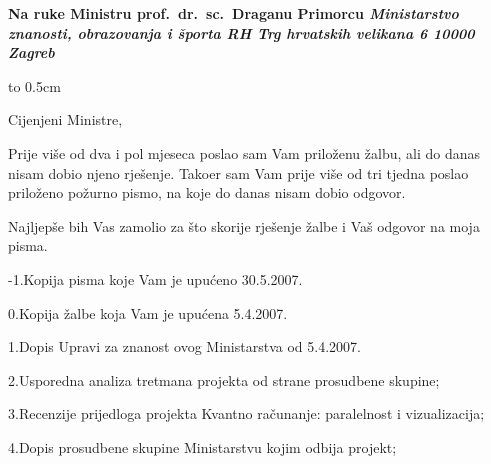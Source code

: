 \parindent=0cm


\address
\parindent=20pt
\bf 
\medskip
Na ruke
Ministru prof.~dr.~sc.~Draganu Primorcu 
\smallskip
\it Ministarstvo znanosti, obrazovanja i \v sporta RH
\rm Trg hrvatskih velikana 6 
10000 Zagreb

\endaddress

\vbox to 0.5cm{\vfill}


\parindent=0pt    


\bigskip\bigskip\bigskip
Cijenjeni Ministre, 


\bigskip\bigskip

Prije  vi\v se od dva i pol mjeseca poslao sam Vam prilo\v zenu 
\v zalbu, ali do danas nisam dobio njeno rje\v senje. Tako\dj er 
sam Vam prije vi\v se od tri tjedna poslao prilo\v zeno po\v zurno 
pismo, na koje do danas nisam dobio odgovor.

\parindent=20pt    
\medskip
Najljep\v se bih Vas zamolio za \v sto skorije rje\v senje \v zalbe i 
Va\v s odgovor na moja pisma.   

\bigskip\bigskip



\rm
\bigskip\bigskip\bigskip\bigskip\bigskip\bigskip

\medskip 
{}


\bigskip\bigskip\bigskip\bigskip\bigskip\bigskip
\parindent=0pt   
\sss
{}


\medskip
\item{-1.}Kopija pisma koje Vam je upu\'ceno 30.5.2007.

\smallskip
\item{0.}Kopija \v zalbe koja Vam je upu\'cena 5.4.2007.

\smallskip
\item{1.}Dopis \ssi Upravi za znanost\/ \sss ovog Ministarstva 
od 5.4.2007.

\smallskip
\item{2.}Usporedna analiza tretmana projekta od strane prosudbene 
skupine;

\smallskip
\item{3.}Recenzije prijedloga projekta \ssi Kvantno ra\v cunanje: 
paralelnost i vizualizacija\sss;

\smallskip
\item{4.}Dopis prosudbene skupine Ministarstvu kojim odbija projekt;

